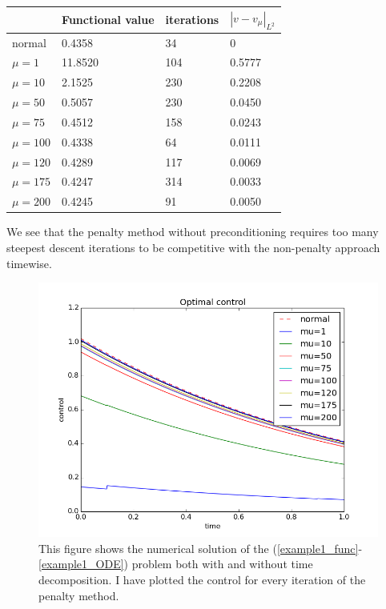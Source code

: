 \documentclass[11pt,a4paper]{article}
\begin{document}
 \begin{center}
    \begin{tabular}{| l | l | l | l |}
    \hline
     & Functional value &iterations  & $|v-v_{\mu}|_{L^2}$   \\ \hline
    normal &0.4358 & 34& 0 	\\ \hline
    $\mu=1$ & 11.8520& 104&0.5777	\\ \hline
    $\mu=10$ &2.1525 &230& 0.2208	\\ \hline
    $\mu=50$ &0.5057&230& 0.0450	\\ \hline
    $\mu=75$ &0.4512 &158& 0.0243\\ \hline
    $\mu=100$ &0.4338&64&0.0111	\\ \hline
    $\mu=120$ &0.4289&117&0.0069\\ \hline
    $\mu=175$ &0.4247&314&0.0033\\ \hline
    $\mu=200$ &0.4245&91&0.0050\\ \hline
    \end{tabular}
\end{center}
We see that the penalty method without preconditioning requires too many steepest descent iterations to be competitive with the non-penalty approach timewise. 
\begin{figure}
  \includegraphics[width=\linewidth]{test1_PC_control.png}
  \caption{This figure shows the numerical solution of the (\ref{example1_func}-\ref{example1_ODE}) problem both with and without time decomposition. I have plotted the control for every iteration of the penalty method.} 
  \label{Fig 1}
\end{figure}
\end{document}

